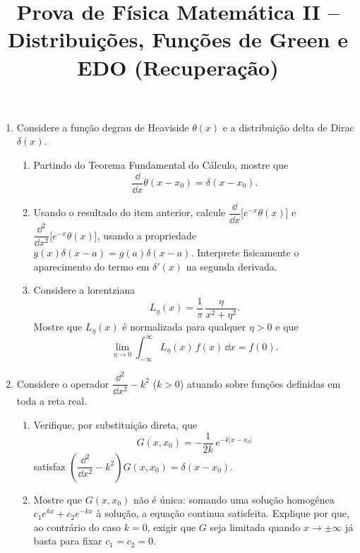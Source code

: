 \newif\ifuseseminar
\useseminartrue


\title{Prova de Física Matemática II -- Distribuições, Funções de Green e EDO (Recuperação)}



\begin{enumerate}

	\item Considere a função degrau de Heaviside $\theta(x)$ e a distribuição
	      delta de Dirac $\delta(x)$.
	      \begin{enumerate}
		      \item Partindo do Teorema Fundamental do Cálculo, mostre que
		            $$
			            \frac{\dd}{\dd x}\theta(x-x_0) = \delta(x-x_0).
		            $$
		      \item Usando o resultado do item anterior, calcule
		            $\dfrac{\dd}{\dd x}\big[e^{-x}\theta(x)\big]$ e
		            $\dfrac{\dd^2}{\dd x^2}\big[e^{-x}\theta(x)\big]$, usando a
		            propriedade $g(x)\delta(x-a) = g(a)\delta(x-a)$. Interprete
		            fisicamente o aparecimento do termo em $\delta'(x)$ na
		            segunda derivada.
		      \item Considere a lorentziana
		            $$
			            L_\eta(x) = \frac{1}{\pi}\,\frac{\eta}{x^2+\eta^2}.
		            $$
		            Mostre que $L_\eta(x)$ é normalizada para qualquer $\eta>0$
		            e que
		            $$
			            \lim_{\eta\to0}\int_{-\infty}^{\infty} L_\eta(x)\, f(x)\,\dd x = f(0).
		            $$
	      \end{enumerate}

	\item Considere o operador $\dfrac{\dd^2}{\dd x^2}-k^2$ ($k>0$) atuando
	      sobre funções definidas em toda a reta real.
	      \begin{enumerate}
		      \item Verifique, por substituição direta, que
		            $$
			            G(x,x_0) = -\frac{1}{2k}\, e^{-k|x-x_0|}
		            $$
		            satisfaz $\left(\dfrac{\dd^2}{\dd x^2}-k^2\right)G(x,x_0) = \delta(x-x_0)$.
		      \item Mostre que $G(x,x_0)$ não é única: somando uma solução
		            homogênea $c_1 e^{kx}+c_2 e^{-kx}$ à solução, a equação
		            continua satisfeita. Explique por que, ao contrário do caso
		            $k=0$, exigir que $G$ seja limitada quando $x\to\pm\infty$
		            já basta para fixar $c_1=c_2=0$.
	      \end{enumerate}


\end{enumerate}
